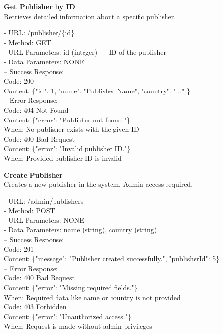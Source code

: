 \begin{flushleft}
    \textbf{Get Publisher by ID} \\
    Retrieves detailed information about a specific publisher.

    - URL: /publisher/\{id\} \\
    - Method: GET \\
    - URL Parameters: id (integer) — ID of the publisher \\
    - Data Parameters: NONE \\
    – Success Response: \\
    Code: 200 \\
    Content: \{"id": 1, "name": "Publisher Name", "country": "..." \} \\
    – Error Response: \\
    Code: 404 Not Found \\
    Content: \{"error": "Publisher not found."\} \\
    When: No publisher exists with the given ID \\
    Code: 400 Bad Request \\
    Content: \{"error": "Invalid publisher ID."\} \\
    When: Provided publisher ID is invalid
\end{flushleft}

\begin{flushleft}
    \textbf{Create Publisher} \\
    Creates a new publisher in the system. Admin access required.

    - URL: /admin/publishers \\
    - Method: POST \\
    - URL Parameters: NONE \\
    - Data Parameters: name (string), country (string) \\
    – Success Response: \\
    Code: 201 \\
    Content: \{"message": "Publisher created successfully.", "publisherId": 5\} \\
    – Error Response: \\
    Code: 400 Bad Request \\
    Content: \{"error": "Missing required fields."\} \\
    When: Required data like name or country is not provided \\
    Code: 403 Forbidden \\
    Content: \{"error": "Unauthorized access."\} \\
    When: Request is made without admin privileges
\end{flushleft}

